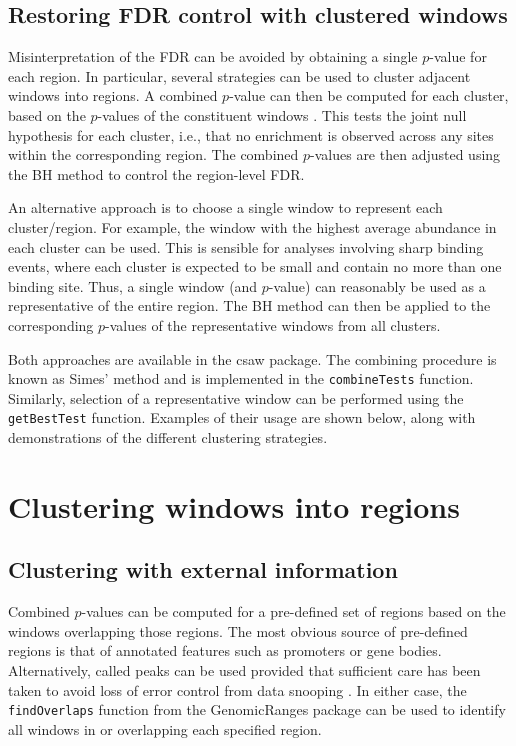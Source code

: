 \documentclass[12pt]{report}
\newcommand{\pkgname}{csaw}
\newcommand{\code}[1]{{\small\texttt{#1}}}
\newcommand{\granges}{GenomicRanges}
\begin{document}

\subsection{Restoring FDR control with clustered windows}
Misinterpretation of the FDR can be avoided by obtaining a single $p$-value for each region.
In particular, several strategies can be used to cluster adjacent windows into regions.
A combined $p$-value can then be computed for each cluster, based on the $p$-values of the constituent windows \citep{simes1986}.
This tests the joint null hypothesis for each cluster, i.e., that no enrichment is observed across any sites within the corresponding region. 
The combined $p$-values are then adjusted using the BH method to control the region-level FDR.

An alternative approach is to choose a single window to represent each cluster/region.
For example, the window with the highest average abundance in each cluster can be used.
This is sensible for analyses involving sharp binding events, where each cluster is expected to be small and contain no more than one binding site.
Thus, a single window (and $p$-value) can reasonably be used as a representative of the entire region.
The BH method can then be applied to the corresponding $p$-values of the representative windows from all clusters.

Both approaches are available in the \pkgname{} package.
The combining procedure is known as Simes' method and is implemented in the \code{combineTests} function.
Similarly, selection of a representative window can be performed using the \code{getBestTest} function.
Examples of their usage are shown below, along with demonstrations of the different clustering strategies.

\section{Clustering windows into regions}

\subsection{Clustering with external information}
Combined $p$-values can be computed for a pre-defined set of regions based on the windows overlapping those regions. 
The most obvious source of pre-defined regions is that of annotated features such as promoters or gene bodies.
Alternatively, called peaks can be used provided that sufficient care has been taken to avoid loss of error control from data snooping \citep{lun2014}.
In either case, the \code{findOverlaps} function from the \granges{} package can be used to identify all windows in or overlapping each specified region. 
\end{document}
